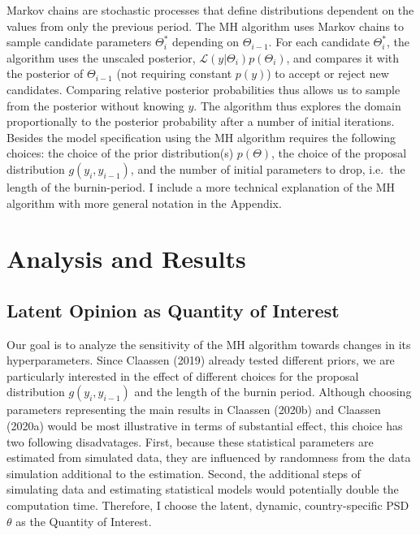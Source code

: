 \documentclass[12pt,english,a4paper,oneside]{article}
\theoremstyle{definition}
\theoremstyle{definition}
\theoremstyle{definition}
\theoremstyle{definition}
\theoremstyle{remark}
\begin{document}
Markov chains are stochastic processes that define distributions dependent on the values from only the previous period. The MH algorithm uses Markov chains to sample candidate parameters \(\Theta_i^*\) depending on \(\Theta_{i-1}\). For each candidate \(\Theta_i^*\), the algorithm uses the unscaled posterior, \(\mathcal{L}(y|\Theta_i)p(\Theta_i)\), and compares it with the posterior of \(\Theta_{i-1}\) (not requiring constant \(p(y)\)) to accept or reject new candidates. Comparing relative posterior probabilities thus allows us to sample from the posterior without knowing \(y\). The algorithm thus explores the domain proportionally to the posterior probability after a number of initial iterations. Besides the model specification using the MH algorithm requires the following choices: the choice of the prior distribution(s) \(p(\Theta)\), the choice of the proposal distribution \(g(y_i, y_{i-1})\), and the number of initial parameters to drop, i.e.~the length of the burnin-period. I include a more technical explanation of the MH algorithm with more general notation in the Appendix.

\hypertarget{analysis-and-results}{%
\section{Analysis and Results}\label{analysis-and-results}}

\hypertarget{latent-opinion-as-quantity-of-interest}{%
\subsection{Latent Opinion as Quantity of Interest}\label{latent-opinion-as-quantity-of-interest}}

Our goal is to analyze the sensitivity of the MH algorithm towards changes in its hyperparameters. Since Claassen (2019) already tested different priors, we are particularly interested in the effect of different choices for the proposal distribution \(g(y_i, y_{i-1})\) and the length of the burnin period. Although choosing
parameters representing the main results in Claassen (2020b) and Claassen (2020a) would be most illustrative in terms of substantial effect, this choice has two following disadvatages. First, because these statistical parameters are estimated from simulated data, they are influenced by randomness from the data simulation additional to the estimation. Second, the additional steps of simulating data and estimating statistical models would potentially double the computation time. Therefore, I choose the latent, dynamic, country-specific PSD \(\theta\) as the Quantity of Interest.
\end{document}
